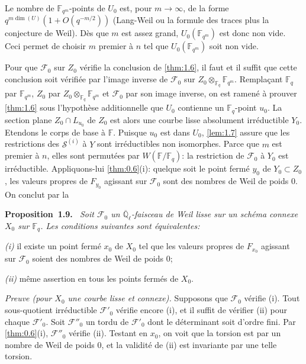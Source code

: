 \documentclass[10pt,a4paper]{article}
\makeatletter
\theoremstyle{plain}
\theoremstyle{definition}
\newenvironment{manualblock}[4]{%
  \par\medskip\noindent\textbf{#1~#2#3.}\def\@currentlabel{#2}\label{#4}\itshape\ }{\par\normalfont\medskip}
\makeatother
\begin{document}
Le nombre de $\mathbb{F}_{q^m}$-points de $U_0$ est, pour $m \to \infty$, de la forme $q^{m\dim(U)}(1+O(q^{-m/2}))$ (Lang-Weil ou la formule des traces plus la conjecture de Weil). D\`es que $m$ est assez grand, $U_0(\mathbb{F}_{q^m})$ est donc non vide. Ceci permet de choisir $m$ premier \`a $n$ tel que $U_0(\mathbb{F}_{q^m})$ soit non vide.

Pour que $\mathcal{F}_0$ sur $Z_0$ v\'erifie la conclusion de \ref{thm:1.6}, il faut et il suffit que cette conclusion soit v\'erifi\'ee par l'image inverse de $\mathcal{F}_0$ sur $Z_0 \otimes_{\mathbb{F}_q} \mathbb{F}_{q^m}$. Rempla\c{c}ant $\mathbb{F}_q$ par $\mathbb{F}_{q^m}$, $Z_0$ par $Z_0 \otimes_{\mathbb{F}_q} \mathbb{F}_{q^m}$ et $\mathcal{F}_0$ par son image inverse, on est ramen\'e \`a prouver \ref{thm:1.6} sous l'hypoth\`ese additionnelle que $U_0$ contienne un $\mathbb{F}_q$-point $u_0$. La section plane $Z_0 \cap L_{u_0}$ de $Z_0$ est alors une courbe lisse absolument irr\'eductible $Y_0$. Etendons le corps de base \`a $\mathbb{F}$. Puisque $u_0$ est dans $U_0$, \ref{lem:1.7} assure que les restrictions des $\mathcal{S}^{(i)}$ \`a $Y$ sont irr\'eductibles non isomorphes. Parce que $m$ est premier \`a $n$, elles sont permut\'ees par $W(\mathbb{F}/\mathbb{F}_q)$: la restriction de $\mathcal{F}_0$ \`a $Y_0$ est irr\'eductible. Appliquons-lui \ref{thm:0.6}(i): quelque soit le point ferm\'e $y_0$ de $Y_0 \subset Z_0$, les valeurs propres de $F_{y_0}$ agissant sur $\mathcal{F}_0$ sont des nombres de Weil de poids $0$. On conclut par la

\begin{manualblock}{Proposition}{1.9}{}{prop:1.9}
Soit $\mathcal{F}_0$ un $\overline{\mathbb{Q}}_\ell$-faisceau de Weil lisse sur un sch\'ema connexe $X_0$ sur $\mathbb{F}_q$. Les conditions suivantes sont \'equivalentes:

\emph{(i)} il existe un point ferm\'e $x_0$ de $X_0$ tel que les valeurs propres de $F_{x_0}$ agissant sur $\mathcal{F}_0$ soient des nombres de Weil de poids $0$;

\emph{(ii)} m\^eme assertion en tous les points ferm\'es de $X_0$.
\end{manualblock}

\noindent\textit{Preuve (pour $X_0$ une courbe lisse et connexe).} Supposons que $\mathcal{F}_0$ v\'erifie (i). Tout sous-quotient irr\'eductible $\mathcal{F}'_0$ v\'erifie encore (i), et il suffit de v\'erifier (ii) pour chaque $\mathcal{F}'_0$. Soit $\mathcal{F}''_0$ un tordu de $\mathcal{F}'_0$ dont le d\'eterminant soit d'ordre fini. Par \ref{thm:0.6}(i), $\mathcal{F}''_0$ v\'erifie (ii). Testant en $x_0$, on voit que la torsion est par un nombre de Weil de poids $0$, et la validit\'e de (ii) est invariante par une telle torsion.
\end{document}
